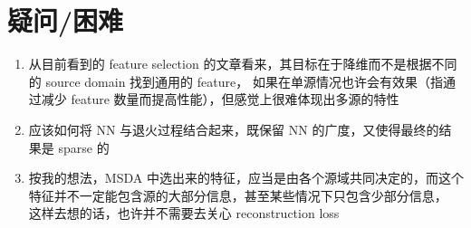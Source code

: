 \documentclass[UTF8]{ctexart}
\begin{document}
    \section{疑问/困难}
        \begin{enumerate}
            \item 从目前看到的 feature selection 的文章看来，其目标在于降维而不是根据不同的 source domain 找到通用的 feature，
                如果在单源情况也许会有效果（指通过减少 feature 数量而提高性能），但感觉上很难体现出多源的特性
            \item 应该如何将 NN 与退火过程结合起来，既保留 NN 的广度，又使得最终的结果是 sparse 的
            \item 按我的想法，MSDA 中选出来的特征，应当是由各个源域共同决定的，而这个特征并不一定能包含源的大部分信息，甚至某些情况下只包含少部分信息，
                这样去想的话，也许并不需要去关心 reconstruction loss
        \end{enumerate}
\end{document}
